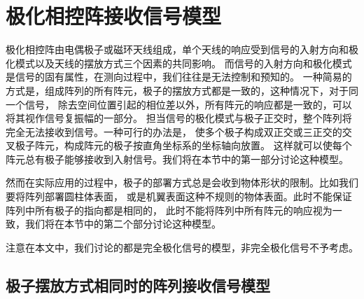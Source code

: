 \documentclass[master]{thesis-uestc}
\begin{document}
\section{极化相控阵接收信号模型}
极化相控阵由电偶极子或磁环天线组成，单个天线的响应受到信号的入射方向和极化模式以及天线的摆放方式三个因素的共同影响。
而信号的入射方向和极化模式是信号的固有属性，在测向过程中，我们往往是无法控制和预知的。
一种简易的方式是，组成阵列的所有阵元，极子的摆放方式都是一致的，这种情况下，对于同一个信号，
除去空间位置引起的相位差以外，所有阵元的响应都是一致的，可以将其视作信号复振幅的一部分。
担当信号的极化模式与极子正交时，整个阵列将完全无法接收到信号。一种可行的办法是，
使多个极子构成双正交或三正交的交叉极子阵元，构成阵元的极子按直角坐标系的坐标轴向放置。
这样就可以使每个阵元总有极子能够接收到入射信号。我们将在本节中的第一部分讨论这种模型。

然而在实际应用的过程中，极子的部署方式总是会收到物体形状的限制。比如我们要将阵列部署圆柱体表面，
或是机翼表面这种不规则的物体表面。此时不能保证阵列中所有极子的指向都是相同的，
此时不能将阵列中所有阵元的响应视为一致，我们将在本节中的第二个部分讨论这种模型。

注意在本文中，我们讨论的都是完全极化信号的模型，非完全极化信号不予考虑。

\subsection{极子摆放方式相同时的阵列接收信号模型}
\end{document}
